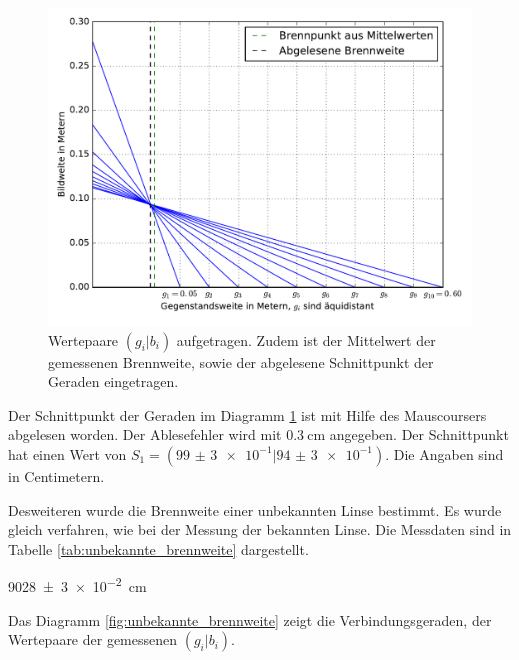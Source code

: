\begin{figure}
  \centering
  \includegraphics[width=\textwidth]{Pics/Messung1_brennnweite_bekannt.pdf}
  \caption{Wertepaare $(g_i|b_i)$ aufgetragen. Zudem ist der Mittelwert der gemessenen Brennweite, sowie der abgelesene Schnittpunkt der Geraden eingetragen.}
  \label{fig:brennweite_bekannt}
\end{figure}

Der Schnittpunkt der Geraden im Diagramm \ref{fig:brennweite_bekannt}
ist mit Hilfe des Mauscoursers abgelesen worden. Der Ablesefehler wird mit
$\SI{0,3}{\centi\meter}$ angegeben.
Der Schnittpunkt hat einen Wert von $S_1 = (\num{99(3)e-1}|\num{94(3)e-1})$.
Die Angaben sind in Centimetern.

Desweiteren wurde die Brennweite einer unbekannten Linse bestimmt.
Es wurde gleich verfahren, wie bei der Messung der bekannten Linse.
Die Messdaten sind in Tabelle \ref{tab:unbekannte_brennweite} dargestellt.

\begin{description}
  \centering
  \item[$<f_2>\ua{gemessen}=$]\SI{9028(3)e-2}{\centi\meter}
\end{description}

Das Diagramm \ref{fig:unbekannte_brennweite} zeigt die Verbindungsgeraden,
der Wertepaare der gemessenen $(g_i|b_i)$.

